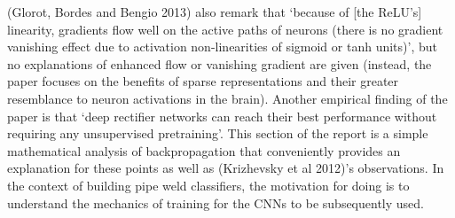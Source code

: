 \documentclass[a4paper,11pt]{article}
\begin{document}
(Glorot, Bordes and Bengio 2013) also remark that `because of [the ReLU's] linearity, gradients flow well on the active paths of neurons (there is no gradient vanishing effect due to activation non-linearities of sigmoid or tanh units)', but no explanations of enhanced flow or vanishing gradient are given (instead, the paper focuses on the benefits of sparse representations and their greater resemblance to neuron activations in the brain). Another empirical finding of the paper is that `deep rectifier networks can reach their best performance without requiring any unsupervised pretraining'. This section of the report is a simple mathematical analysis of backpropagation that conveniently provides an explanation for these points as well as (Krizhevsky et al 2012)'s observations. In the context of building pipe weld classifiers, the motivation for doing is to understand the mechanics of training for the CNNs to be subsequently used. \\

\end{document}
